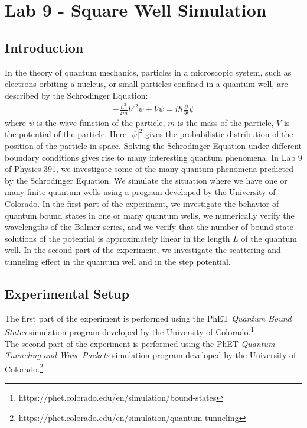 \documentclass[11pt]{book}
\theoremstyle{break}
\theoremstyle{break}
\newcommand{\pd}{\partial}
\begin{document}
\newpage
\tableofcontents
{}


\chapter*{Lab 9 - Square Well Simulation}
\section{Introduction}
\setcounter{chapter}{9}
In the theory of quantum mechanics, particles in a microscopic system, such as electrons orbiting a nucleus, or small particles confined in a quantum well, are described by the Schrodinger Equation:
\begin{align}
-\frac{\hbar^2}{2m}\nabla^2\psi + V\psi = i\hbar \frac{\pd}{\pd t}\psi
\end{align}
where $\psi$ is the wave function of the particle, $m$ is the mass of the particle, $V$ is the potential of the particle. Here $|\psi|^2$ gives the probabilistic distribution of the position of the particle in space. Solving the Schrodinger Equation under different boundary conditions gives rise to many interesting quantum phenomena. In Lab 9 of Physics 391, we investigate some of the many quantum phenomena predicted by the Schrodinger Equation. We simulate the situation where we have one or many finite quantum wells using a program developed by the University of Colorado. In the first part of the experiment, we investigate the behavior of quantum bound states in one or many quantum wells, we numerically verify the wavelengths of the Balmer series, and we verify that the number of bound-state solutions of the potential is approximately linear in the length $L$ of the quantum well. In the second part of the experiment, we investigate the scattering and tunneling effect in the quantum well and in the step potential. \\

\section{Experimental Setup}
The first part of the experiment is performed using the PhET \textit{Quantum Bound States} simulation program developed by the University of Colorado.\footnote{https://phet.colorado.edu/en/simulation/bound-states}\\

The second part of the experiment is performed using the PhET \textit{Quantum Tunneling and Wave Packets} simulation program developed by the University of Colorado.\footnote{https://phet.colorado.edu/en/simulation/quantum-tunneling}\\
\end{document}
